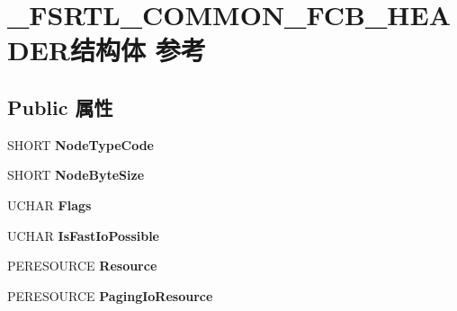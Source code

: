 \hypertarget{struct___f_s_r_t_l___c_o_m_m_o_n___f_c_b___h_e_a_d_e_r}{}\section{\+\_\+\+F\+S\+R\+T\+L\+\_\+\+C\+O\+M\+M\+O\+N\+\_\+\+F\+C\+B\+\_\+\+H\+E\+A\+D\+E\+R结构体 参考}
\label{struct___f_s_r_t_l___c_o_m_m_o_n___f_c_b___h_e_a_d_e_r}
\subsection*{Public 属性}
\begin{DoxyCompactItemize}
\item 
\mbox{\label{struct___f_s_r_t_l___c_o_m_m_o_n___f_c_b___h_e_a_d_e_r_aca6b84acf382760531847ba86844c9ea}} 
S\+H\+O\+RT {\bfseries Node\+Type\+Code}
\item 
\mbox{\label{struct___f_s_r_t_l___c_o_m_m_o_n___f_c_b___h_e_a_d_e_r_a7121a9389f6470b6633c6a448fc2521b}} 
S\+H\+O\+RT {\bfseries Node\+Byte\+Size}
\item 
\mbox{\label{struct___f_s_r_t_l___c_o_m_m_o_n___f_c_b___h_e_a_d_e_r_aed48f069bcd6d53c0b873ad55f46a499}} 
U\+C\+H\+AR {\bfseries Flags}
\item 
\mbox{\label{struct___f_s_r_t_l___c_o_m_m_o_n___f_c_b___h_e_a_d_e_r_a6d8b890c04fd98e2e8e6d4575f18b282}} 
U\+C\+H\+AR {\bfseries Is\+Fast\+Io\+Possible}
\item 
\mbox{\label{struct___f_s_r_t_l___c_o_m_m_o_n___f_c_b___h_e_a_d_e_r_a7a57e97728fa68f01b126ba05e0b9d00}} 
P\+E\+R\+E\+S\+O\+U\+R\+CE {\bfseries Resource}
\item 
\mbox{\label{struct___f_s_r_t_l___c_o_m_m_o_n___f_c_b___h_e_a_d_e_r_ab70eec711e74b85edae84b41830518d2}} 
P\+E\+R\+E\+S\+O\+U\+R\+CE {\bfseries Paging\+Io\+Resource}

\end{DoxyCompactItemize}
